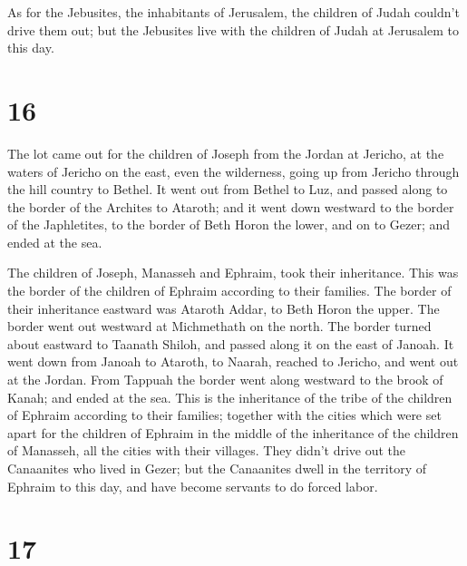  As for the Jebusites, the inhabitants of Jerusalem, the
children of Judah couldn't drive them out; but the Jebusites live with
the children of Judah at Jerusalem to this day.

\hypertarget{section-15}{%
\section{16}\label{section-15}}

 The lot came out for the children of Joseph from the Jordan
at Jericho, at the waters of Jericho on the east, even the wilderness,
going up from Jericho through the hill country to Bethel. 
It went out from Bethel to Luz, and passed along to the border of the
Archites to Ataroth;  and it went down westward to the
border of the Japhletites, to the border of Beth Horon the lower, and on
to Gezer; and ended at the sea.

 The children of Joseph, Manasseh and Ephraim, took their
inheritance.  This was the border of the children of Ephraim
according to their families. The border of their inheritance eastward
was Ataroth Addar, to Beth Horon the upper.  The border went
out westward at Michmethath on the north. The border turned about
eastward to Taanath Shiloh, and passed along it on the east of Janoah.
 It went down from Janoah to Ataroth, to Naarah, reached to
Jericho, and went out at the Jordan.  From Tappuah the
border went along westward to the brook of Kanah; and ended at the sea.
This is the inheritance of the tribe of the children of Ephraim
according to their families;  together with the cities which
were set apart for the children of Ephraim in the middle of the
inheritance of the children of Manasseh, all the cities with their
villages.  They didn't drive out the Canaanites who lived
in Gezer; but the Canaanites dwell in the territory of Ephraim to this
day, and have become servants to do forced labor.

\hypertarget{section-16}{%
\section{17}\label{section-16}}

